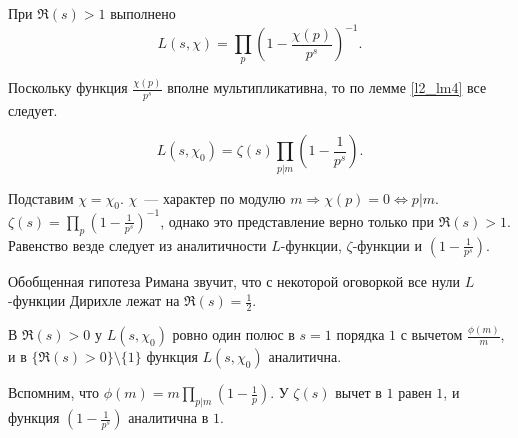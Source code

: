\begin{lemma} \label{l7_Euler_ident}
	При $\Re(s) > 1$ выполнено
	$$L(s, \chi) = \prod_{p} \left(1 - \frac{\chi(p)}{p^s} \right)^{-1}.$$
\end{lemma}
\begin{pf}
	Поскольку функция $\displaystyle \frac{\chi(p)}{p^s}$ вполне мультипликативна, то по лемме \ref{l2_lm4} все следует.
\end{pf}

\begin{corollary} \label{l7_cor1}
	$$L(s, \chi_0) = \zeta(s) \prod_{p | m} \left( 1 - \frac{1}{p^s} \right).$$
\end{corollary}
\begin{pf}	
	Подставим $\chi = \chi_0$. $\chi$ — характер по модулю $m \Rightarrow \chi(p) = 0 \Leftrightarrow p | m$.
	$\displaystyle \zeta(s) = \prod_p  \left( 1 - \frac{1}{p^s} \right)^{-1}$, однако это представление верно только при
	$\Re(s) > 1$. Равенство везде следует из аналитичности $L$-функции, $\zeta$-функции и $\displaystyle \left(1 - \frac{1}{p^s} \right)$.
\end{pf}

\begin{note}
	Обобщенная гипотеза Римана звучит, что с некоторой оговоркой все нули $L$-функции Дирихле лежат на
	$\displaystyle \Re(s) = \frac{1}{2}$.
\end{note}

\begin{corollary} \label{l7_col2}
	В $\Re(s) > 0$ у $L(s, \chi_0)$ ровно один полюс в $s = 1$ порядка $1$ с вычетом $\displaystyle \frac{\phi(m)}{m}$, и в $\lbrace \Re(s) > 0 \rbrace \setminus \lbrace{1\rbrace}$ функция $L(s, \chi_0)$ аналитична.
\end{corollary}
\begin{pf}
	Вспомним, что $\displaystyle \phi(m) = m \prod_{p | m} \left( 1 - \frac{1}{p} \right)$. У $\zeta(s)$ вычет в $1$ равен $1$, и функция $\displaystyle \left(1 - \frac{1}{p^s} \right)$ аналитична в $1$.
\end{pf}

